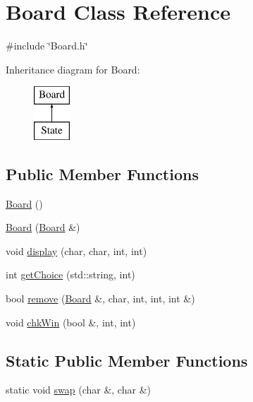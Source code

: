 \hypertarget{class_board}{\section{Board Class Reference}
\label{class_board}
}


{\ttfamily \#include \char`\"{}Board.\-h\char`\"{}}

Inheritance diagram for Board\-:\begin{figure}[H]
\begin{center}
\leavevmode
\includegraphics[height=2.000000cm]{class_board}
\end{center}
\end{figure}
\subsection*{Public Member Functions}
\begin{DoxyCompactItemize}
\item 
\hyperlink{class_board_a9ee491d4fea680cf69b033374a9fdfcb}{Board} ()
\item 
\hyperlink{class_board_ab7d6d506f23ebce7179e88ce9f15eb6c}{Board} (\hyperlink{class_board}{Board} \&)
\item 
void \hyperlink{class_board_a8b7e2a5722a7ec5527d853fb43494aa3}{display} (char, char, int, int)
\item 
int \hyperlink{class_board_a72a4e5c6530afafb6617e044f39ce7f2}{get\-Choice} (std\-::string, int)
\item 
bool \hyperlink{class_board_acaacbbbe559e3648019e1eddc7c94a1b}{remove} (\hyperlink{class_board}{Board} \&, char, int, int, int \&)
\item 
void \hyperlink{class_board_a94f4902b3feba31138f01f16dc1148c1}{chk\-Win} (bool \&, int, int)
\end{DoxyCompactItemize}
\subsection*{Static Public Member Functions}
\begin{DoxyCompactItemize}
\item 
static void \hyperlink{class_board_a6c43132a8b631bda53df49dce4ba93db}{swap} (char \&, char \&)
\end{DoxyCompactItemize}
